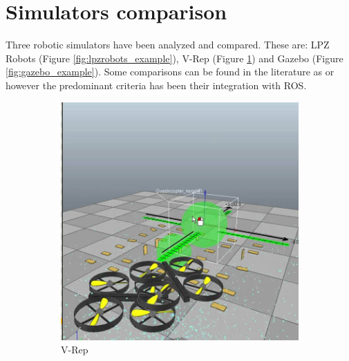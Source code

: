 \section{Simulators comparison} %
\label{sec:sim_comparison_of_simulators}
Three robotic simulators have been analyzed and compared. 
These are: LPZ Robots \cite{lpzrobots} (Figure \ref{fig:lpzrobots_example}), V-Rep \cite{vrep} (Figure \ref{fig:vrep_example}) and Gazebo \cite{gazebo} (Figure \ref{fig:gazebo_example}).
Some comparisons can be found in the literature as \cite{nogueiracomparative} or \cite{staranowicz2011survey} however the predominant criteria has been their integration with ROS.

\begin{figure}[hb!]
  \begin{subfigure}{.33\textwidth}
    \centering
    \includegraphics[width=.95\linewidth]{figures/vrep_example}
    \caption{V-Rep}
    \label{fig:vrep_example}
  \end{subfigure}%
  \begin{subfigure}{.33\textwidth}
    \centering

\end{subfigure}
\end{figure}
